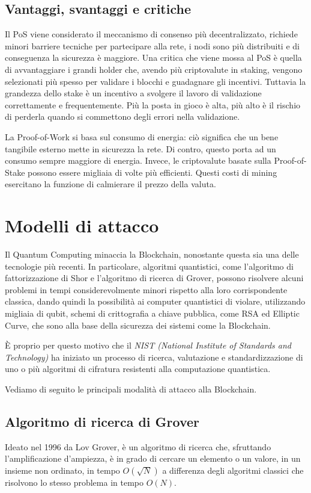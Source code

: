 \subsection{Vantaggi, svantaggi e critiche}
Il PoS viene considerato il meccanismo di consenso più decentralizzato, richiede minori barriere tecniche per partecipare alla rete, i nodi sono più distribuiti e di conseguenza la sicurezza è maggiore. Una critica che viene mossa al PoS è quella di avvantaggiare i grandi holder che, avendo più criptovalute in staking, vengono selezionati più spesso per validare i blocchi e guadagnare gli incentivi. Tuttavia la grandezza dello stake è un incentivo a svolgere il lavoro di validazione correttamente e frequentemente. Più la posta in gioco è alta, più alto è il rischio di perderla quando si commettono degli errori nella validazione.

La Proof-of-Work si basa sul consumo di energia: ciò significa che un bene tangibile esterno mette in sicurezza la rete. Di contro, questo porta ad un consumo sempre maggiore di energia. Invece, le criptovalute basate sulla Proof-of-Stake possono essere migliaia di volte più efficienti. Questi costi di mining esercitano la funzione di calmierare il prezzo della valuta.

\section{Modelli di attacco}
Il Quantum Computing minaccia la Blockchain, nonostante questa sia una delle tecnologie più recenti. In particolare, algoritmi quantistici, come l'algoritmo di fattorizzazione di Shor e l'algoritmo di ricerca di Grover, possono risolvere alcuni problemi in tempi considerevolmente minori rispetto alla loro corrispondente classica, dando quindi la possibilità ai computer quantistici di violare, utilizzando migliaia di qubit, schemi di crittografia a chiave pubblica, come RSA ed Elliptic Curve, che sono alla base della sicurezza dei sistemi come la Blockchain.

È proprio per questo motivo che il \textit{NIST (National Institute of Standards and Technology)} ha iniziato un processo di ricerca, valutazione e standardizzazione di uno o più algoritmi di cifratura resistenti alla computazione quantistica.

Vediamo di seguito le principali modalità di attacco alla Blockchain.

\subsection{Algoritmo di ricerca di Grover}
Ideato nel 1996 da Lov Grover, è un algoritmo di ricerca che, sfruttando l'amplificazione d'ampiezza, è in grado di cercare un elemento o un valore, in un insieme non ordinato, in tempo \(O\left(\sqrt{N}\right)\) a differenza degli algoritmi classici che risolvono lo stesso problema in tempo \(O\left(N\right)\).

